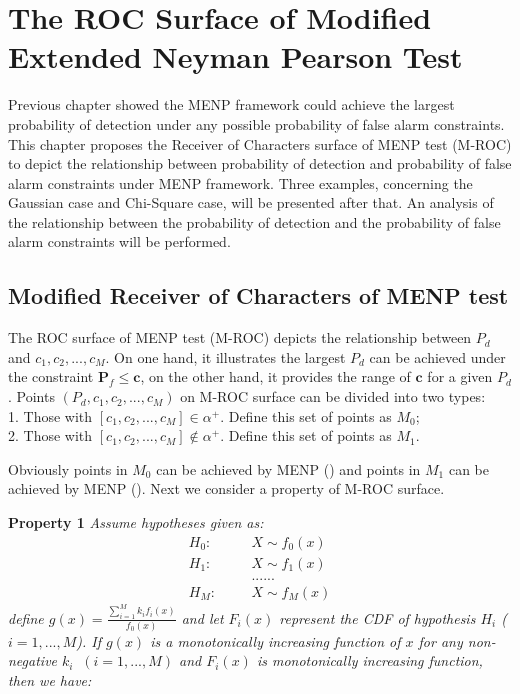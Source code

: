 \chapter{The ROC Surface of Modified Extended Neyman Pearson Test}
Previous chapter showed the MENP framework could achieve the largest probability of detection under any possible probability of false alarm constraints. This chapter proposes the Receiver of Characters surface of MENP test (M-ROC) to depict the relationship between probability of detection and probability of false alarm constraints under MENP framework. Three examples,  concerning the Gaussian case and Chi-Square case, will be presented after that. An analysis of the relationship between the probability of detection and the probability of false alarm constraints will be performed. 

\section{Modified Receiver of Characters of MENP test}

The ROC surface of MENP test (M-ROC) depicts the relationship between $P_d$ and $c_1, c_2, ..., c_M$. On one hand, it  illustrates the largest $P_d$ can be achieved under the constraint $\mathbf{P}_{f} \leq \mathbf{c}$, on the other hand, it provides the range of $\mathbf{c}$ for a given $P_d$.
Points $(P_d, c_1, c_2, ..., c_M)$ on M-ROC  surface can be divided into two types: 
\\1. Those with $[c_1, c_2, ..., c_M] \in \alpha^+$. Define this set of points as $M_0$; 
\\2. Those with $[c_1, c_2, ..., c_M] \notin \alpha^+$. Define this set of points as $M_1$. 

Obviously points in $M_0$ can be achieved by MENP () and points in $M_1$ can  be achieved by MENP (). Next we consider a property of M-ROC surface.

\noindent \textbf{Property 1}
\noindent \textit{
  \noindent Assume hypotheses given as:
}
\begin{equation}
  \begin{split}
	H_0:\;\;\;\;\;\;&X \sim f_0(x)\\
	H_1:\;\;\;\;\;\;&X \sim f_1(x)\\
	&......\\
	H_M:\;\;\;\;\;\;&X \sim f_M(x)
  \end{split}
\end{equation}
\textit{
  define $g(x) = \frac{\sum_{i=1}^{M}k_if_i(x)}{f_0(x)}$ and let $F_i(x)$ represent the CDF of hypothesis $H_i$ ($i = 1, ..., M$). If $g(x)$ is a monotonically increasing function of $x$ for any non-negative $k_i\;\;(i = 1, ..., M)$ and $F_i(x)$ is monotonically increasing function, then we have:}


